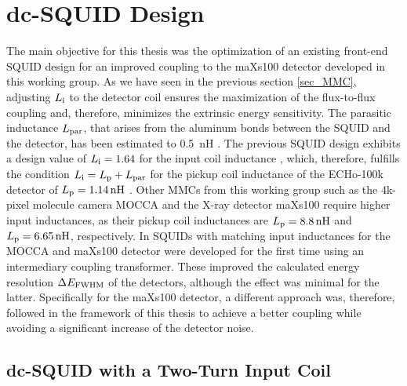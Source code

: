 \chapter{dc-SQUID Design} \label{ch_SQUIDdesign}

The main objective for this thesis was the optimization of an existing front-end SQUID design for an improved coupling to the maXs100 detector developed in this working group. As we have seen in the previous section \ref{sec_MMC}, adjusting $L_{\rm i}$ to the detector coil ensures the maximization of the flux-to-flux coupling and, therefore, minimizes the extrinsic energy sensitivity. The parasitic inductance $L_{\rm par}$, that arises from the aluminum bonds between the SQUID and the detector, has been estimated to \qty{0.5}{\nano\henry} \cite{Hengstler2017}. The previous SQUID design exhibits a design value of $L_{\rm i}=1.64$ for the input coil inductance \cite{Bauer2022}, which, therefore, fulfills the condition $L_{\rm i}=L_{\rm p}+L_{\rm par}$ for the pickup coil inductance of the ECHo-100k detector of $L_{\rm p}=\qty{1.14}{\nano\henry}$ \cite{Mantegazzini2021}. Other MMCs from this working group such as the 4k-pixel molecule camera MOCCA and the X-ray detector maXs100 require higher input inductances, as their pickup coil inductances are $L_{\rm p}=\qty{8.8}{\nano\henry}$ and $L_{\rm p}=\qty{6.65}{\nano\henry}$, respectively. In \cite{Bauer2022} SQUIDs with matching input inductances for the MOCCA and maXs100 detector were developed for the first time using an intermediary coupling transformer. These improved the calculated energy resolution $\Delta E_{\rm FWHM}$ of the detectors, although the effect was minimal for the latter. Specifically for the maXs100 detector, a different approach was, therefore, followed in the framework of this thesis to achieve a better coupling while avoiding a significant increase of the detector noise.  

\section{dc-SQUID with a Two-Turn Input Coil} \label{sec_FEdesign}

